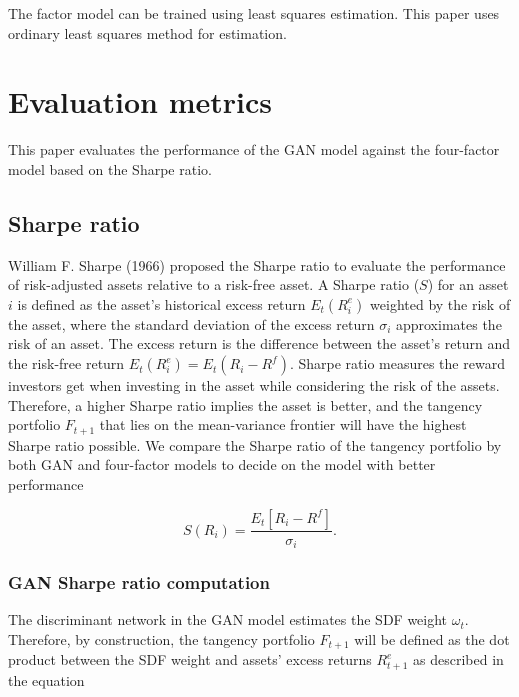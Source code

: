 \documentclass[12pt]{article}
\begin{document}
The factor model can be trained using least squares
estimation. This paper uses ordinary least squares method
for estimation.

\hypertarget{evaluation-metrics}{%
\section{Evaluation metrics}\label{evaluation-metrics}}

\thispagestyle{plain}

This paper evaluates the performance of the GAN model against the
four-factor model based on the Sharpe ratio.

\hypertarget{sharpe_ratio}{%
\subsection{Sharpe ratio}\label{sharpe_ratio}}

William F. Sharpe (1966) proposed the Sharpe ratio to evaluate
the performance of risk-adjusted assets relative to a
risk-free asset. A Sharpe ratio (\(S\))
for an asset \(i\) is defined as the asset's historical excess
return \(E_t(R^e_{i})\) weighted by the risk of the asset,
where the standard deviation of the excess return \(\sigma_i\)
approximates the risk of an asset. The excess return is the
difference between the asset's return and the risk-free
return \(E_t(R^e_{i}) = E_t(R_{i} - R^f)\). Sharpe ratio
measures the reward investors get when investing in the
asset while considering the risk of the
assets. Therefore, a higher Sharpe ratio implies the asset
is better, and the tangency portfolio \(F_{t+1}\) that lies
on the mean-variance frontier will have the highest Sharpe
ratio possible.
We compare the Sharpe ratio of the tangency portfolio by
both GAN and four-factor models to decide on the model with
better performance

\[
S(R_i) = \frac{E_t[R_i - R^f]}{\sigma_i}.
\]

\hypertarget{gan-sharpe-ratio-computation}{%
\subsubsection{GAN Sharpe ratio computation}\label{gan-sharpe-ratio-computation}}

The discriminant network in the GAN model estimates the SDF
weight \(\omega_t\). Therefore, by construction, the
tangency portfolio \(F_{t+1}\) will be defined as the dot
product between the SDF weight and assets' excess returns
\(R^e_{t+1}\) as described in the equation
\end{document}
